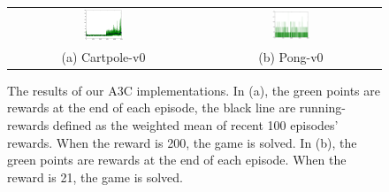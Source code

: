 \begin{figure}[h!]
\centering
\begin{tabular}{c c}
\includegraphics[width=0.22\textwidth]{./fig/myA3C_cartpole_rewardsplot.png} &
\includegraphics[width=0.22\textwidth]{./fig/myA3C_pong_rewardsplot.png}\\
(a) Cartpole-v0 & (b) Pong-v0  \\
\end{tabular}
\caption{The results of our A3C implementations. In (a), the green points are rewards at the end of each episode,
the black line are running-rewards defined as the weighted mean of recent 100 episodes' rewards. When the reward is 200, 
the game is solved. In (b), the green points are rewards at the end of each episode. When the reward is 21, the game is solved.}
\label{fig:A3C_baselines}
\end{figure}







